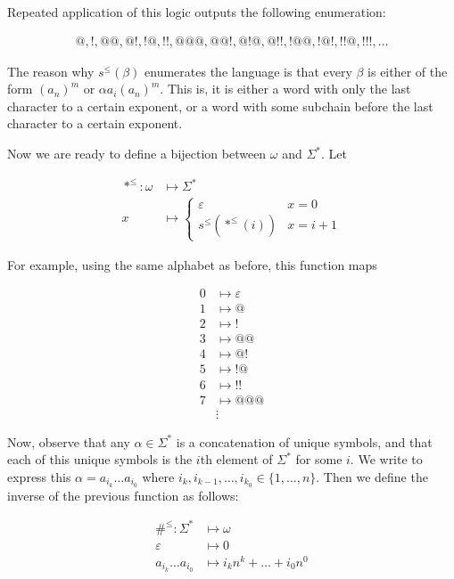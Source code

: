 \documentclass[a4paper, 12pt]{article}
\begin{document}
Repeated application of this logic outputs the following enumeration: 

\begin{align*}
    @, !, @@, @!, !@, !!, @@@, @@!, @!@, @!!, !@@, !@!, !!@, !!!, \ldots
\end{align*}

The reason why $s^{\leq}( \beta  )$ enumerates the language is that every $\beta
$ is either of the form $(a_n)^{m}$ or $\alpha a_i (a_n)^{m}$. This is, it is
either a word with only the last character to a certain exponent, or a word with
some subchain before the last character to a certain exponent.

Now we are ready to define a bijection between $\omega$ and $\Sigma^{*}$. Let 

\begin{align*}
    *^{\leq} : \omega &\mapsto \Sigma^{*} \\ 
    x &\mapsto \begin{cases}
        \varepsilon & x = 0 \\ 
        s^{\leq} \left( *^{\leq} \left( i \right)  \right) & x = i + 1
    \end{cases}
\end{align*}

For example, using the same alphabet as before, this function maps 

\begin{align*}
    0 &\mapsto \varepsilon \\ 
    1 &\mapsto @ \\ 
    2 &\mapsto ! \\ 
    3 &\mapsto @@ \\ 
    4 &\mapsto @! \\ 
    5 &\mapsto !@ \\ 
    6 &\mapsto  !! \\ 
    7 &\mapsto  @@@ \\ 
      &\vdots
\end{align*}

Now, observe that any $\alpha \in \Sigma^{*}$ is a concatenation of unique
symbols, and that each of this unique symbols is the $i$th element of
$\Sigma^{*}$ for some $i$. We write to express this $\alpha = a_{i_k}\ldots
a_{i_0}$ where $i_{k}, i_{k-1}, \ldots, i_{k_0} \in \{ 1, \ldots, n\}$. Then we
define the inverse of the previous function as follows: 

\begin{align*}
    \#^{\leq} : \Sigma^{*} &\mapsto \omega \\ 
    \varepsilon & \mapsto 0 \\ 
    a_{i_k} \ldots a_{i_0} &\mapsto i_k n^{k} + \ldots + i_0 n^0
\end{align*}
\end{document}
